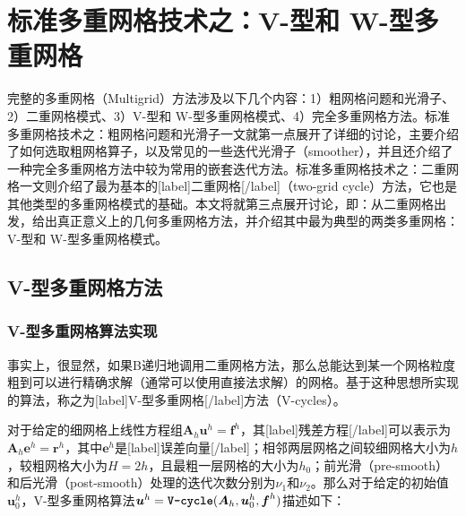 \documentclass[12pt, UTF8, nofonts]{ctexart}
\begin{document}

\section*{标准多重网格技术之：V-型和 W-型多重网格}

完整的多重网格（Multigrid）方法涉及以下几个内容：1）粗网格问题和光滑子、2）二重网格模式、3）V-型和 W-型多重网格模式、4）完全多重网格方法。标准多重网格技术之：粗网格问题和光滑子一文就第一点展开了详细的讨论，主要介绍了如何选取粗网格算子，以及常见的一些迭代光滑子（smoother），并且还介绍了一种完全多重网格方法中较为常用的嵌套迭代方法。标准多重网格技术之：二重网格一文则介绍了最为基本的[label]二重网格[/label]（two-grid cycle）方法，它也是其他类型的多重网格模式的基础。本文将就第三点展开讨论，即：从二重网格出发，给出真正意义上的几何多重网格方法，并介绍其中最为典型的两类多重网格：V-型和 W-型多重网格模式。

\subsection*{V-型多重网格方法}

\subsubsection*{V-型多重网格算法实现}

事实上，很显然，如果B递归地调用二重网格方法，那么总能达到某一个网格粒度粗到可以进行精确求解（通常可以使用直接法求解）的网格。基于这种思想所实现的算法，称之为[label]V-型多重网格[/label]方法（V-cycles）。

对于给定的细网格上线性方程组$\boldsymbol{A}_h\boldsymbol{u}^h=\boldsymbol{f}^h$，其[label]残差方程[/label]可以表示为$\boldsymbol{A}_h\boldsymbol{e}^h=\boldsymbol{r}^h$，其中$\boldsymbol{e}^h$是[label]误差向量[/label]；相邻两层网格之间较细网格大小为$h$，较粗网格大小为$H=2h$，且最粗一层网格的大小为$h_0$；前光滑（pre-smooth）和后光滑（post-smooth）处理的迭代次数分别为$\nu_1$和$\nu_2$。那么对于给定的初始值$\boldsymbol{u}_0^h$，V-型多重网格算法$\boldsymbol{u}^h=\textbf{\texttt{V-cycle}}(\boldsymbol{A}_h,\boldsymbol{u}_0^h,\boldsymbol{f}^h)$描述如下：
\end{document}
